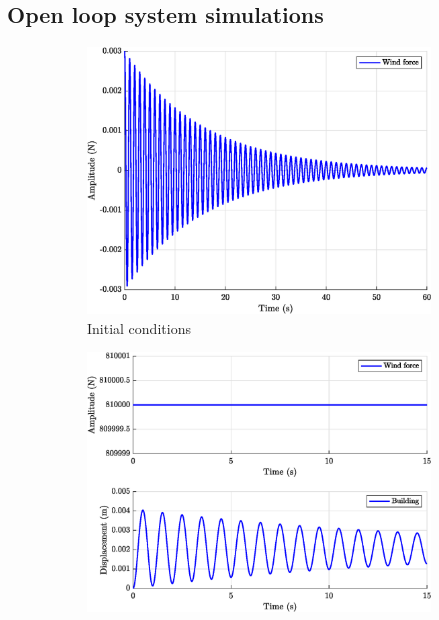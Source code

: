 \subsection{Open loop system simulations}
\begin{figure}[H]
    \centering
    \begin{subfigure}{0.495\textwidth}
        \includegraphics[width=\textwidth]{resources/eps/initial-condition.eps}
        \caption{Initial conditions}
        \label{fig:q4.initial}
    \end{subfigure}
    \begin{subfigure}{0.495\textwidth}
        \includegraphics[width=\textwidth]{resources/eps/constant-wind.eps}

\end{subfigure}
\end{figure}
